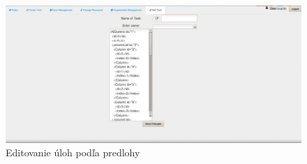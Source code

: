 {\begin{figure}[htb]
\begin{center}
\end{center}

\end{figure}

\begin{figure}[htb]

\begin{center}

\includegraphics[scale=0.5]{page6.jpg} 
\caption{Editovanie úloh podľa predlohy}


\end{center}

\end{figure}



}

